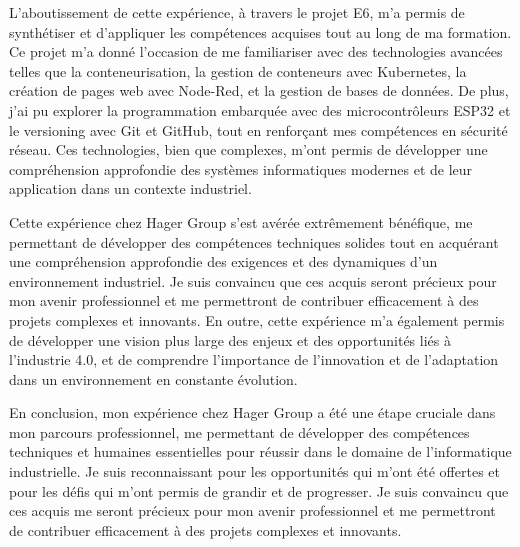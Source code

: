 \documentclass[a4paper,11pt]{article}
\begin{document}
L'aboutissement de cette expérience, à travers le projet E6, m'a permis de synthétiser et d'appliquer les compétences acquises tout au long de ma formation. Ce projet m'a donné l'occasion de me familiariser avec des technologies avancées telles que la conteneurisation, la gestion de conteneurs avec Kubernetes, la création de pages web avec Node-Red, et la gestion de bases de données. De plus, j'ai pu explorer la programmation embarquée avec des microcontrôleurs ESP32 et le versioning avec Git et GitHub, tout en renforçant mes compétences en sécurité réseau. Ces technologies, bien que complexes, m'ont permis de développer une compréhension approfondie des systèmes informatiques modernes et de leur application dans un contexte industriel.\newline

Cette expérience chez Hager Group s'est avérée extrêmement bénéfique, me permettant de développer des compétences techniques solides tout en acquérant une compréhension approfondie des exigences et des dynamiques d'un environnement industriel. Je suis convaincu que ces acquis seront précieux pour mon avenir professionnel et me permettront de contribuer efficacement à des projets complexes et innovants. En outre, cette expérience m'a également permis de développer une vision plus large des enjeux et des opportunités liés à l'industrie 4.0, et de comprendre l'importance de l'innovation et de l'adaptation dans un environnement en constante évolution.\newline

En conclusion, mon expérience chez Hager Group a été une étape cruciale dans mon parcours professionnel, me permettant de développer des compétences techniques et humaines essentielles pour réussir dans le domaine de l'informatique industrielle. Je suis reconnaissant pour les opportunités qui m'ont été offertes et pour les défis qui m'ont permis de grandir et de progresser. Je suis convaincu que ces acquis me seront précieux pour mon avenir professionnel et me permettront de contribuer efficacement à des projets complexes et innovants.
\end{document}
